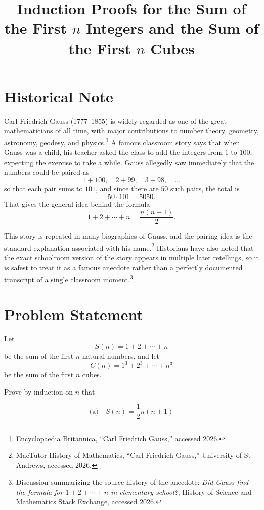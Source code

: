 \documentclass[12pt]{article}
\title{Induction Proofs for the Sum of the First \(n\) Integers and the Sum of the First \(n\) Cubes}
\author{}
\date{}
\begin{document}
\maketitle

\section*{Historical Note}

Carl Friedrich Gauss (1777--1855) is widely regarded as one of the great mathematicians of all time, with major contributions to number theory, geometry, astronomy, geodesy, and physics.\footnote{Encyclopaedia Britannica, ``Carl Friedrich Gauss,'' accessed 2026.} A famous classroom story says that when Gauss was a child, his teacher asked the class to add the integers from \(1\) to \(100\), expecting the exercise to take a while. Gauss allegedly saw immediately that the numbers could be paired as
\[
1+100,\quad 2+99,\quad 3+98,\quad \dots
\]
so that each pair sums to \(101\), and since there are \(50\) such pairs, the total is
\[
50\cdot 101 = 5050.
\]
That gives the general idea behind the formula
\[
1+2+\cdots+n = \frac{n(n+1)}{2}.
\]

This story is repeated in many biographies of Gauss, and the pairing idea is the standard explanation associated with his name.\footnote{MacTutor History of Mathematics, ``Carl Friedrich Gauss,'' University of St Andrews, accessed 2026.} Historians have also noted that the exact schoolroom version of the story appears in multiple later retellings, so it is safest to treat it as a famous anecdote rather than a perfectly documented transcript of a single classroom moment.\footnote{Discussion summarizing the source history of the anecdote: \textit{Did Gauss find the formula for \(1+2+\cdots+n\) in elementary school?}, History of Science and Mathematics Stack Exchange, accessed 2026.}

\vspace{4cm}

\newpage

\section*{Problem Statement}

Let
\[
S(n)=1+2+\cdots+n
\]
be the sum of the first \(n\) natural numbers, and let
\[
C(n)=1^3+2^3+\cdots+n^3
\]
be the sum of the first \(n\) cubes.

Prove by induction on \(n\) that

\[
\text{(a)}\quad S(n)=\frac{1}{2}n(n+1)
\]
\end{document}
